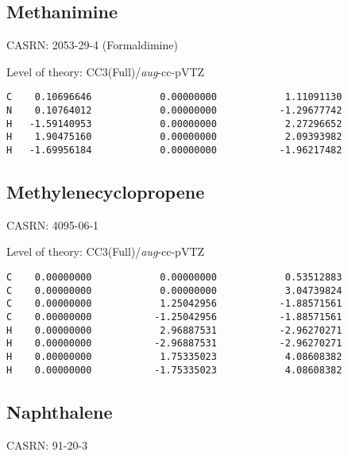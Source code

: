 \documentclass[journal=jctcce,manuscript=article,layout=traditional]{achemso}
\newcommand{\AVTZ}{\emph{aug}-cc-pVTZ}
\begin{document}
\subsection{Methanimine}

CASRN: 2053-29-4 (Formaldimine)

\begin{singlespace}
\noindent  Level of theory: CC3(Full)/{\AVTZ}
\begin{verbatim}
C    0.10696646            0.00000000            1.11091130
N    0.10764012            0.00000000           -1.29677742
H   -1.59140953            0.00000000            2.27296652
H    1.90475160            0.00000000            2.09393982
H   -1.69956184            0.00000000           -1.96217482    
\end{verbatim}
\end{singlespace}

\subsection{Methylenecyclopropene}

CASRN: 4095-06-1

\begin{singlespace}
\noindent   Level of theory: CC3(Full)/{\AVTZ}
\begin{verbatim}
C    0.00000000            0.00000000            0.53512883
C    0.00000000            0.00000000            3.04739824
C    0.00000000            1.25042956           -1.88571561
C    0.00000000           -1.25042956           -1.88571561
H    0.00000000            2.96887531           -2.96270271
H    0.00000000           -2.96887531           -2.96270271
H    0.00000000            1.75335023            4.08608382
H    0.00000000           -1.75335023            4.08608382
\end{verbatim}
\end{singlespace}

\subsection{Naphthalene}

CASRN: 91-20-3
\end{document}

